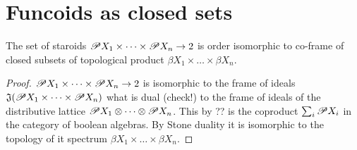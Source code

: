 \chapter{Funcoids as closed sets}



\begin{thm}
The set of staroids
$\mathscr{P} X_1\times\dots\times\mathscr{P} X_n\to 2$ is
order isomorphic to co-frame of closed subsets of topological
product $\beta X_1\times\dots\times\beta X_n$.
\end{thm}

\begin{proof}
$\mathscr{P} X_1\times\dots\times\mathscr{P} X_n\to 2$ is isomorphic to
the frame of ideals
$\mathfrak{J}(\mathscr{P} X_1\times\dots\times\mathscr{P} X_n)$ what is
dual (check!) to the frame of ideals of the distributive lattice
$\mathscr{P} X_1\otimes\dots\otimes\mathscr{P} X_n$.
This by ?? is the coproduct $\sum_i \mathscr{P} X_i$ in the category
of boolean algebras.
By Stone duality it is isomorphic to the topology of it spectrum
$\beta X_1\times\dots\times\beta X_n$.
\end{proof}

